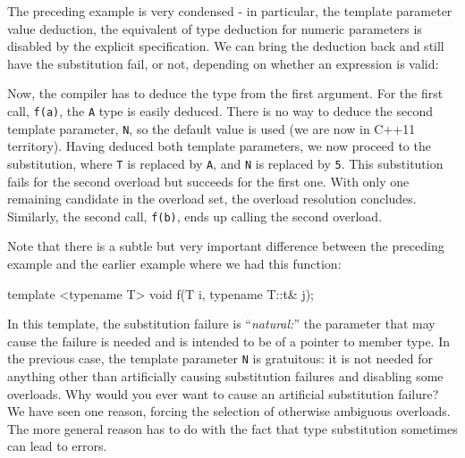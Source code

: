 The preceding example is very condensed - in particular, the template parameter value deduction, the equivalent of type deduction for numeric parameters is disabled by the explicit specification. We can bring the deduction back and still have the substitution fail, or not, depending on whether an expression is valid:


Now, the compiler has to deduce the type from the first argument. For the first call, \texttt{f(a)}, the \texttt{A} type is easily deduced. There is no way to deduce the second template parameter, \texttt{N}, so the default value is used (we are now in C++11 territory). Having deduced both template parameters, we now proceed to the substitution, where \texttt{T} is replaced by \texttt{A}, and \texttt{N} is replaced by \texttt{5}. This substitution fails for the second overload but succeeds for the first one. With only one remaining candidate in the overload set, the overload resolution concludes. Similarly, the second call, \texttt{f(b)}, ends up calling the second overload.

Note that there is a subtle but very important difference between the preceding example and the earlier example where we had this function:

\begin{code}
template <typename T> void f(T i, typename T::t& j);
\end{code}

In this template, the substitution failure is ``\emph{natural:}'' the parameter that may cause the failure is needed and is intended to be of a pointer to member type. In the previous case, the template parameter \texttt{N} is gratuitous: it is not needed for anything other than artificially causing substitution failures and disabling some overloads. Why would you ever want to cause an artificial substitution failure? We have seen one reason, forcing the selection of otherwise ambiguous overloads. The more general reason has to do with the fact that type substitution sometimes can lead to errors.

